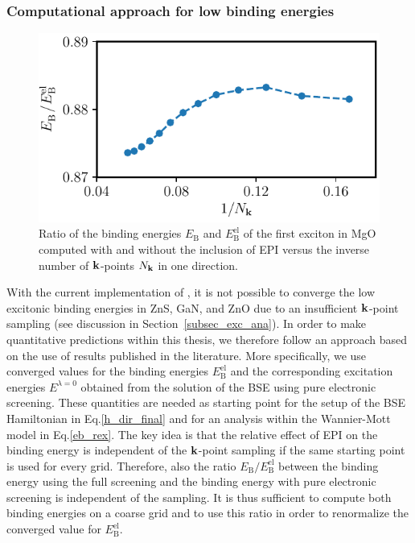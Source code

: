 \subsubsection{Computational approach for low binding energies}\label{subsec_compapproach}
 \begin{figure}[t]
\captionsetup{format=plain}
\centering
\includegraphics{work/plots/mgo_rel_conv.pdf}
\vspace{-2mm}
\caption[Ratio of the  binding energies $E_\text{B}^{\phantom{l}}$ and $E^\text{el}_\text{B}$ of the first exciton in MgO computed with and without the inclusion of EPI versus the inverse number of $\k$-points.]{Ratio of the  binding energies $E_\text{B}^{\phantom{l}}$ and $E^\text{el}_\text{B}$ of the first exciton in MgO computed with and without the inclusion of EPI  versus the inverse number of $\k$-points $N_{\mathbf{k}}$ in one direction. \label{conv_rel}}
\end{figure}
With the current implementation of \exciting{}, it is not possible to converge the low excitonic  binding energies in ZnS, GaN, and ZnO due to an insufficient $\k$-point sampling (see discussion in Section~\ref{subsec_exc_ana}). In order to make quantitative predictions within this thesis, we therefore follow an approach based on the use of  results published in the literature. More specifically, we use converged values for the binding energies $E^\text{el}_\text{B}$ and the corresponding excitation energies $E^{\lambda=0}$ obtained from the solution of the BSE using pure electronic screening. These quantities are needed as starting point for the setup of the BSE Hamiltonian in Eq.\;\eqref{h_dir_final} and for an analysis within the Wannier-Mott model in Eq.\;\eqref{eb_rex}. The key idea is that the relative effect of EPI on the binding energy is independent of the $\k$-point sampling if the same starting point is used for every grid. Therefore, also the ratio $E_\text{B}^{\phantom{l}}/E^\text{el}_\text{B}$ between the binding energy using the full screening and the binding energy with pure electronic screening is independent of the sampling. It is thus sufficient to compute both binding energies on a coarse grid and to use this ratio in order to renormalize the converged value for  $E^\text{el}_\text{B}$.\par
